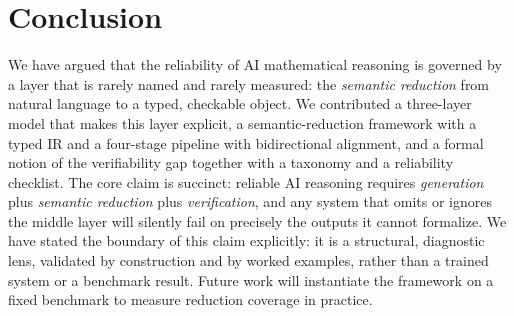 \documentclass[11pt]{article}
\theoremstyle{definition}
\theoremstyle{plain}
\theoremstyle{remark}
\begin{document}
\section{Conclusion}
We have argued that the reliability of AI mathematical reasoning is governed by a layer that
is rarely named and rarely measured: the \emph{semantic reduction} from natural language to a
typed, checkable object. We contributed a three-layer model that makes this layer explicit, a
semantic-reduction framework with a typed IR and a four-stage pipeline with bidirectional
alignment, and a formal notion of the verifiability gap together with a taxonomy and a
reliability checklist. The core claim is succinct: reliable AI reasoning requires
\emph{generation} plus \emph{semantic reduction} plus \emph{verification}, and any system
that omits or ignores the middle layer will silently fail on precisely the outputs it cannot
formalize. We have stated the boundary of this claim explicitly: it is a structural,
diagnostic lens, validated by construction and by worked examples, rather than a trained
system or a benchmark result. Future work will instantiate the framework on a fixed
benchmark to measure reduction coverage in practice.
\end{document}
